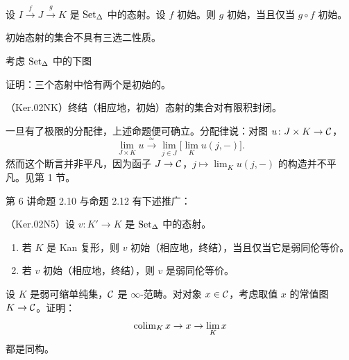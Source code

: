\begin{exercise}\label{L7-3.13}
设 $I\xrightarrow{f}J\xrightarrow{g}K$ 是 $\operatorname{Set}_\Delta$ 中的态射。设 $f$ 初始。则 $g$ 初始，当且仅当 $g\circ f$ 初始。
\end{exercise}

\begin{warning}\label{L7-3.14}
初始态射的集合不具有三选二性质。
\end{warning}

\begin{exercise}\label{L7-3.15}
考虑 $\operatorname{Set}_\Delta$ 中的下图
\begin{center}
\end{center}
证明：三个态射中恰有两个是初始的。
\end{exercise}

\begin{proposition}\label{L7-3.16}
（Ker.02NK）终结（相应地，初始）态射的集合对有限积封闭。
\end{proposition}

\begin{remark}\label{L7-3.17}
一旦有了极限的分配律，上述命题便可确立。分配律说：对图 $u\colon J\times K\to\mathcal{C}$，
\[
\lim_{J\times K}u\xrightarrow{\ \simeq\ }\lim_{j\in J}\Big[\lim_K u(j,-)\Big].
\]
然而这个断言并非平凡，因为函子 $J\to\mathcal{C}$，$j\mapsto\lim_K u(j,-)$ 的构造并不平凡。见第 1 节。
\end{remark}

\nitem\label{L7-3.18} 第 6 讲命题 2.10 与命题 2.12 有下述推广：

\begin{proposition}\label{L7-3.19}
（Ker.02N5）设 $v\colon K'\to K$ 是 $\operatorname{Set}_\Delta$ 中的态射。
\begin{enumerate}[label=(\arabic*),leftmargin=2.4em,itemsep=0.1em]
\item 若 $K$ 是 Kan 复形，则 $v$ 初始（相应地，终结），当且仅当它是弱同伦等价。
\item 若 $v$ 初始（相应地，终结），则 $v$ 是弱同伦等价。
\end{enumerate}
\end{proposition}

\begin{exercise}\label{L7-3.20}
设 $K$ 是弱可缩单纯集，$\mathcal{C}$ 是 $\infty$-范畴。对对象 $x\in\mathcal{C}$，考虑取值 $x$ 的常值图 $K\to\mathcal{C}$。证明：
\[
\operatorname{colim}_K x\to x\to\lim_K x
\]
都是同构。
\end{exercise}

